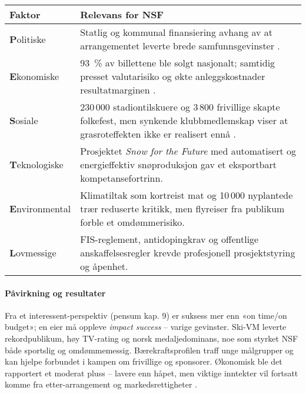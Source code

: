 \begin{table}[H]
    \centering
    \begin{tabular}{@{}p{2.7cm}p{10.2cm}@{}}
        \toprule
        \textbf{Faktor}        & \textbf{Relevans for NSF}                                                                                                                                                  \\ \midrule
        \textbf{P}olitiske     & Statlig og kommunal finansiering avhang av at arrangementet leverte brede samfunnsgevinster \cite{TrondheimKommune}.                                                       \\
        \textbf{E}konomiske    & 93~\% av billettene ble solgt nasjonalt; samtidig presset valutarisiko og økte anleggskostnader resultatmarginen \cite{AdressaKjopefest}.                                  \\
        \textbf{S}osiale       & 230\,000 stadiontilskuere og 3\,800 frivillige skapte folkefest, men synkende klubbmedlemskap viser at grasroteffekten ikke er realisert ennå \cite{Adresseavisen,OsloVM}. \\
        \textbf{T}eknologiske  & Prosjektet \textit{Snow for the Future} med automatisert og energieffektiv snøproduksjon gav et eksportbart kompetansefortrinn\cite{Trondheim2025Sustainability}.          \\
        \textbf{E}nvironmental & Klimatiltak som kortreist mat og 10\,000 nyplantede trær reduserte kritikk, men flyreiser fra publikum forble et omdømmerisiko.                                            \\
        \textbf{L}ovmessige    & FIS-reglement, antidopingkrav og offentlige anskaffelsesregler krevde profesjonell prosjektstyring og åpenhet.                                                             \\ \bottomrule
    \end{tabular}
\end{table}

\paragraph{Påvirkning og resultater}
Fra et interessent-perspektiv (pensum kap. 9) er suksess mer enn «on time/on budget»; en eier må oppleve \textit{impact success} -- varige gevinster. Ski-VM leverte rekordpublikum, høy TV-rating og norsk medaljedominans, noe som styrket NSF både sportslig og omdømmemessig.
Bærekraftsprofilen traff unge målgrupper og kan hjelpe forbundet i kampen om frivillige og sponsorer.
Økonomisk ble det rapportert et moderat pluss -- lavere enn håpet, men viktige inntekter vil fortsatt komme fra etter-arrangement og markedsrettigheter \cite{Trondheim2025Portal,Adresseavisen}.

